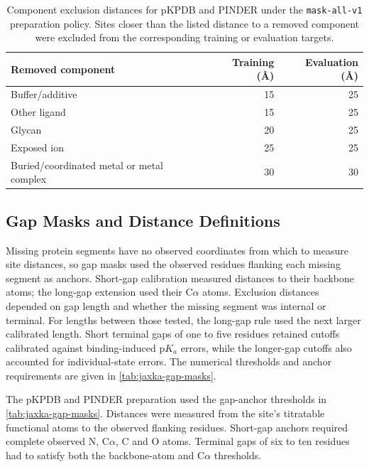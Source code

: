 \begin{table}[htbp]
    \centering
    \small
    \begin{tabular}{lrr}
        \toprule
        Removed component & Training (\AA) & Evaluation (\AA) \\
        \midrule
        Buffer/additive & 15 & 25 \\
        Other ligand & 15 & 25 \\
        Glycan & 20 & 25 \\
        Exposed ion & 25 & 25 \\
        Buried/coordinated metal or metal complex & 30 & 30 \\
        \bottomrule
    \end{tabular}
    \caption{Component exclusion distances for pKPDB and PINDER under the \texttt{mask-all-v1} preparation policy. Sites closer than the listed distance to a removed component were excluded from the corresponding training or evaluation targets.}
    \label{tab:jaxka-component-masks}
\end{table}



\subsection{Gap Masks and Distance Definitions}
\label{app:jaxka-gap-masks}

Missing protein segments have no observed coordinates from which to measure site distances, so gap masks used the observed residues flanking each missing segment as anchors. Short-gap calibration measured distances to their backbone atoms; the long-gap extension used their C$\alpha$ atoms. Exclusion distances depended on gap length and whether the missing segment was internal or terminal. For lengths between those tested, the long-gap rule used the next larger calibrated length. Short terminal gaps of one to five residues retained cutoffs calibrated against binding-induced $\mathrm{p}K_a$ errors, while the longer-gap cutoffs also accounted for individual-state errors. The numerical thresholds and anchor requirements are given in \cref{tab:jaxka-gap-masks}.

The pKPDB and PINDER preparation used the gap-anchor thresholds in \cref{tab:jaxka-gap-masks}. Distances were measured from the site's titratable functional atoms to the observed flanking residues. Short-gap anchors required complete observed N, C$\alpha$, C and O atoms. Terminal gaps of six to ten residues had to satisfy both the backbone-atom and C$\alpha$ thresholds.


